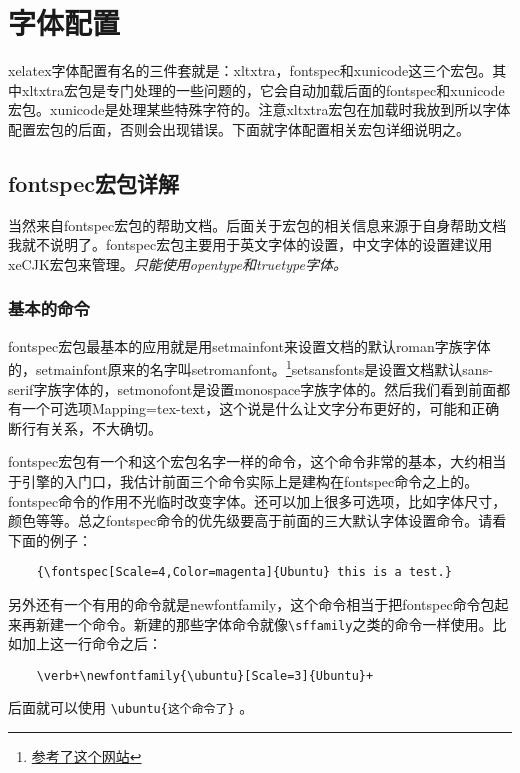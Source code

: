 \documentclass[11pt,oneside]{book}
\begin{document}
  \chapter{字体配置}
  xelatex字体配置有名的三件套就是：xltxtra，fontspec和xunicode这三个宏包。其中xltxtra宏包是专门处理\XeLaTeX 的一些问题的，它会自动加载后面的fontspec和xunicode宏包。xunicode是处理某些特殊字符的。注意xltxtra宏包在加载时我放到所以字体配置宏包的后面，否则会出现错误。下面就字体配置相关宏包详细说明之。


  \section{fontspec宏包详解}
  当然来自fontspec宏包的帮助文档。后面关于宏包的相关信息来源于自身帮助文档我就不说明了。fontspec宏包主要用于英文字体的设置，中文字体的设置建议用xeCJK宏包来管理。\emph{\XeLaTeX 只能使用opentype和truetype字体。}

  \subsection{基本的命令}
  fontspec宏包最基本的应用就是用setmainfont来设置文档的默认roman字族字体的，setmainfont原来的名字叫setromanfont。\footnote{\href{http://tex.stackexchange.com/questions/70413/problem-with-xetex-latex-and-system-fonts}{参考了这个网站}}setsansfonts是设置文档默认sans-serif字族字体的，setmonofont是设置monospace字族字体的。然后我们看到前面都有一个可选项Mapping=tex-text，这个说是什么让\XeTeX 文字分布更好的，可能和正确断行有关系，不大确切。

  fontspec宏包有一个和这个宏包名字一样的命令，这个命令非常的基本，大约相当于引擎的入门口，我估计前面三个命令实际上是建构在fontspec命令之上的。fontspec命令的作用不光临时改变字体。还可以加上很多可选项，比如字体尺寸，颜色等等。总之fontspec命令的优先级要高于前面的三大默认字体设置命令。请看下面的例子：
  \begin{Verbatim}
    {\fontspec[Scale=4,Color=magenta]{Ubuntu} this is a test.}
  \end{Verbatim}

  另外还有一个有用的命令就是newfontfamily，这个命令相当于把fontspec命令包起来再新建一个命令。新建的那些字体命令就像\verb+\sffamily+之类的命令一样使用。比如加上这一行命令之后：
  \begin{Verbatim}
    \verb+\newfontfamily{\ubuntu}[Scale=3]{Ubuntu}+
  \end{Verbatim}

  后面就可以使用 \verb+\ubuntu{这个命令了}+ 。
\end{document}
